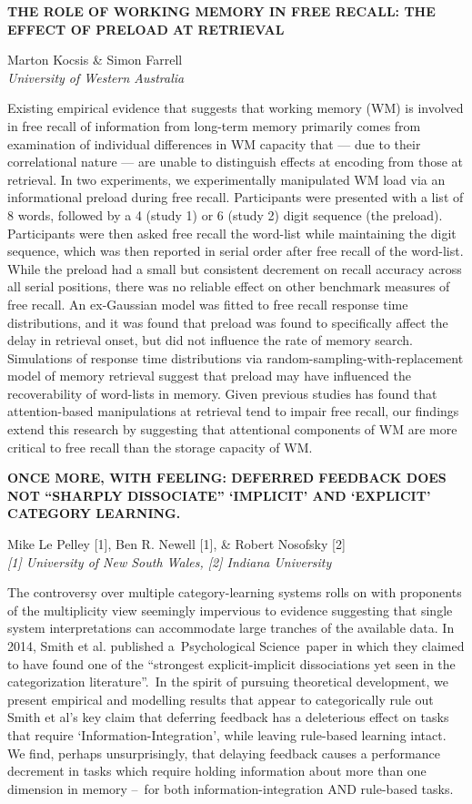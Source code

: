 \documentclass[]{article}
\begin{document}
\textbf{THE ROLE OF WORKING MEMORY IN FREE RECALL: THE EFFECT OF PRELOAD
AT RETRIEVAL}

Marton Kocsis \& Simon Farrell\\
\emph{University of Western Australia}

Existing empirical evidence that suggests that working memory (WM) is
involved in free recall of information from long-term memory primarily
comes from examination of individual differences in WM capacity that ---
due to their correlational nature --- are unable to distinguish effects
at encoding from those at retrieval. In two experiments, we
experimentally manipulated WM load via an informational preload during
free recall. Participants were presented with a list of 8 words,
followed by a 4 (study 1) or 6 (study 2) digit sequence (the preload).
Participants were then asked free recall the word-list while maintaining
the digit sequence, which was then reported in serial order after free
recall of the word-list. While the preload had a small but consistent
decrement on recall accuracy across all serial positions, there was no
reliable effect on other benchmark measures of free recall. An
ex-Gaussian model was fitted to free recall response time distributions,
and it was found that preload was found to specifically affect the delay
in retrieval onset, but did not influence the rate of memory search.
Simulations of response time distributions via
random-sampling-with-replacement model of memory retrieval suggest that
preload may have influenced the recoverability of word-lists in memory.
Given previous studies has found that attention-based manipulations at
retrieval tend to impair free recall, our findings extend this research
by suggesting that attentional components of WM are more critical to
free recall than the storage capacity of WM.\\
\pagebreak  

\textbf{ONCE MORE, WITH FEELING: DEFERRED FEEDBACK DOES NOT ``SHARPLY
DISSOCIATE'' `IMPLICIT' AND `EXPLICIT' CATEGORY LEARNING.}

Mike Le Pelley {[}1{]}, Ben R. Newell {[}1{]}, \& Robert Nosofsky
{[}2{]}\\
\emph{{[}1{]} University of New South Wales, {[}2{]} Indiana University}

The controversy over multiple category-learning systems rolls on with
proponents of the multiplicity view seemingly impervious to evidence
suggesting that single system interpretations can accommodate large
tranches of the available data. In 2014, Smith et al. published
a~Psychological Science~paper in which they claimed to have found one of
the ``strongest explicit-implicit dissociations yet seen in the
categorization literature''.~In the spirit of pursuing theoretical
development, we present empirical and modelling results that appear to
categorically rule out Smith et al's key claim that deferring feedback
has a deleterious effect on tasks that require
`Information-Integration', while leaving rule-based learning intact. We
find, perhaps unsurprisingly, that delaying feedback causes a
performance decrement in tasks which require holding information about
more than one dimension in memory --~for both information-integration
AND rule-based tasks.\\
\pagebreak  
\end{document}
